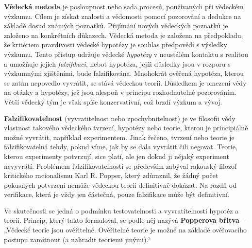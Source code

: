     \begin{tcnote}
      \textbf{Vědecká metoda} je posloupnost nebo sada procesů, používaných při vědeckém výzkumu.
      Cílem je získat znalosti a vědomosti pomocí pozorování a dedukce na základě dosud známých
      poznatků. Přijímání nových vědeckých poznatků je založeno na konkrétních důkazech. Vědecká
      metoda je založena na předpokladu, že kritériem pravdivosti vědecké hypotézy je souhlas
      předpovědí s výsledky výzkumu. Tento přístup udržuje vědecké \emph{hypotézy} v neustálém
      kontaktu s realitou a umožňuje jejich \emph{falzifikaci}, neboť hypotéza, jejíž důsledky jsou
      v rozporu s výzkumnými zjištěními, bude falzifikována. Mnohokrát ověřená hypotéza, kterou se
      zatím nepovedlo vyvrátit, se stává vědeckou teorií. Důsledkem je omezení vědy na otázky a
      hypotézy, jež jsou alespoň v principu rozhodnutelné pozorováním. Větší vědecký tým je však
      spíše konzervativní, což brzdí výzkum a vývoj.

      \textbf{Falzifikovatelnost} (vyvratitelnost nebo zpochybnitelnost) je ve filosofii vědy
      vlastnost takového vědeckého tvrzení, hypotézy nebo teorie, kterou je principiálně možné
      vyvrátit, například experimentem. Jinak řečeno, tvrzení nebo teorie je falzifikovatelná tehdy,
      pokud víme, jak by se dala vyvrátit čili negovat. Teorie, kterou experimenty potvrzují, sice
      platí, ale jen dokud ji nějaký experiment nevyvrátí. Problémem falzifikovatelnosti se
      především zabýval rakouský filozof kritického racionalismu Karl R. Popper, který zdůraznil, že
      žádný počet pokusných potvrzení nemůže vědeckou teorii definitivně dokázat. Na rozdíl od
      verifikace, která je vždy jen částečná, pouze falzifikace může být definitivní.

      {\centering
      \captionsetup{type=figure}
      \label{fyz:fig924}
      \par}

      Ve skutečnosti se jedná o podmínku testovatelnosti a vyvratitelnosti hypotéz a teorií.
      Princip, který takto formuloval, se podle něj nazývá \textbf{Popperova břitva} – „Vědecké
      teorie jsou ověřitelné. Ověřitelné teorie je možné na základě ověřovacího postupu zamítnout (a
      nahradit teoriemi jinými).“


\end{tcnote}
